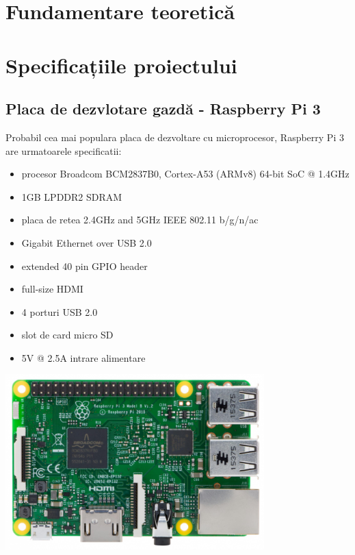 \documentclass[12pt]{report}
\begin{document}
\chapter{Fundamentare teoretică}


\chapter{Specificațiile proiectului}
	\section{Placa de dezvlotare gazdă - Raspberry Pi 3}
Probabil cea mai populara placa de dezvoltare cu microprocesor, Raspberry Pi 3 are urmatoarele specificatii:
\begin{itemize}
\item procesor Broadcom BCM2837B0, Cortex-A53 (ARMv8) 64-bit SoC @ 1.4GHz
\item 1GB LPDDR2 SDRAM
\item placa de retea 2.4GHz and 5GHz IEEE 802.11 b/g/n/ac
\item Gigabit Ethernet over USB 2.0
\item extended 40 pin GPIO header
\item full-size HDMI
\item 4 porturi USB 2.0
\item slot de card micro SD
\item 5V @ 2.5A intrare alimentare
\end{itemize}

\begin{center}
{\includegraphics[width=100mm]{rpi.png}}
\end{center}
\end{document}
